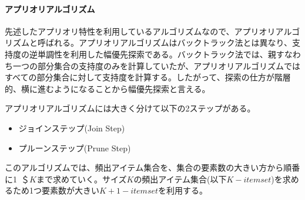 \documentclass[dvipdfmx]{jsarticle}
\begin{document}
\paragraph{アプリオリアルゴリズム}
先述したアプリオリ特性を利用しているアルゴリズムなので、アプリオリアルゴリズムと呼ばれる。アプリオリアルゴリズムはバックトラック法とは異なり、支持度の逆単調性を利用した幅優先探索である。バックトラック法では、親すなわち一つの部分集合の支持度のみを計算していたが、アプリオリアルゴリズムではすべての部分集合に対して支持度を計算する。したがって、探索の仕方が階層的、横に進むようになることから幅優先探索と言える。\par
アプリオリアルゴリズムには大きく分けて以下の2ステップがある。
\begin{itemize}
  \item ジョインステップ(Join Step)
  \item プルーンステップ(Prune Step)
\end{itemize}
このアルゴリズムでは、頻出アイテム集合を、集合の要素数の大きい方から順番に1~＄$K$まで求めていく。サイズ$K$の頻出アイテム集合(以下$K-itemset$)を求めるため1つ要素数が大きい$K+1-itemset$を利用する。
\end{document}
